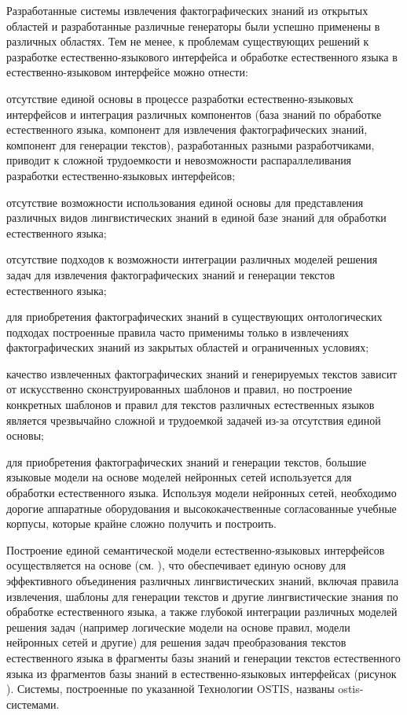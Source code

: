 Разработанные системы извлечения фактографических знаний из открытых областей и разработанные различные генераторы были успешно применены в различных областях. Тем не менее, к проблемам существующих решений к разработке естественно-языкового интерфейса и обработке естественного языка в естественно-языковом интерфейсе можно отнести:
\begin{textitemize}
	\item отсутствие единой основы в процессе разработки естественно-языковых интерфейсов и интеграция различных компонентов (база знаний по обработке естественного языка, компонент для извлечения фактографических знаний, компонент для генерации текстов), разработанных разными разработчиками, приводит к сложной трудоемкости и невозможности распараллеливания разработки естественно-языковых интерфейсов;
	\item отсутствие возможности использования единой основы для представления различных видов лингвистических знаний в единой базе знаний для обработки естественного языка;
	\item отсутствие подходов к возможности интеграции различных моделей решения задач для извлечения фактографических знаний и генерации текстов естественного языка;
	\item для приобретения фактографических знаний в существующих онтологических подходах построенные правила часто применимы только в извлечениях фактографических знаний из закрытых областей и ограниченных условиях;
	\item качество извлеченных фактографических знаний и генерируемых текстов зависит от искусственно сконструированных шаблонов и правил, но построение конкретных шаблонов и правил для текстов различных естественных языков является чрезвычайно сложной и трудоемкой задачей из-за отсутствия единой основы;
	\item для приобретения фактографических знаний и генерации текстов, большие языковые модели на основе моделей нейронных сетей используется для обработки естественного языка. Используя модели нейронных сетей, необходимо дорогие аппаратные оборудования и высококачественные согласованные учебные корпусы, которые  крайне сложно получить и построить.
\end{textitemize}

Построение единой семантической модели естественно-языковых интерфейсов осуществляется на основе  (см. ), что обеспечивает единую основу для эффективного объединения различных лингвистических знаний, включая правила извлечения, шаблоны для генерации текстов и другие лингвистические знания по обработке естественного языка, а также глубокой интеграции различных моделей решения задач (например логические модели на основе правил, модели нейронных сетей и другие) для решения задач преобразования текстов естественного языка в фрагменты базы знаний и генерации текстов естественного языка из фрагментов базы знаний в естественно-языковых интерфейсах (рисунок \textit{}). Системы, построенные по указанной Технологии OSTIS, названы ostis-системами.

